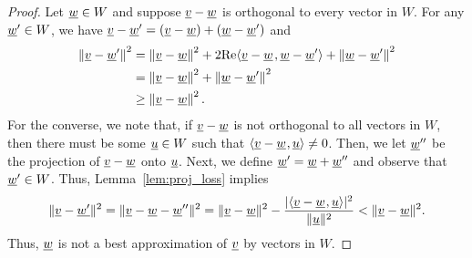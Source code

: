 \begin{proof}
Let $\underline{w} \in W$ and suppose $\underline{v} - \underline{w}$ is orthogonal to every vector in $W$.
For any $\underline{w}' \in W$, we have $\underline{v} - \underline{w}' = \left( \underline{v} - \underline{w} \right) + \left( \underline{w} - \underline{w}' \right)$ and
\begin{equation} \label{equation:OrthogonalVector}
\begin{split}
\left\| \underline{v} - \underline{w}' \right\|^2
&= \left\| \underline{v} - \underline{w} \right\|^2
+ 2 \mathrm{Re} {\left\langle  \underline{v} - \underline{w}  \mskip2mu ,  \underline{w} - \underline{w}'  \right\rangle}
+ \left\| \underline{w} - \underline{w}' \right\|^2 \\
&= \left\| \underline{v} - \underline{w} \right\|^2
+ \left\| \underline{w} - \underline{w}' \right\|^2 \\
&\geq \left\| \underline{v} - \underline{w} \right\|^2.
\end{split}
\end{equation}
For the converse, we note that,
if $\underline{v}-\underline{w}$ is not orthogonal to all vectors in $W$, then there must be some $\underline{u} \in W$ such that ${\langle  \underline{v}-\underline{w}  \mskip1mu ,  \underline{u}  \rangle} \neq 0$.
Then, we let $\underline{w}''$ be the projection of $\underline{v}-\underline{w}$ onto $\underline{u}$.
Next, we define $\underline{w}' = \underline{w}+\underline{w}''$ and observe that $\underline{w}' \in W$.
Thus, Lemma~\ref{lem:proj_loss} implies
\[ \| \underline{v}-\underline{w'} \| ^2 = \| \underline{v}-\underline{w} - \underline{w}'' \| ^2 = \|\underline{v}-\underline{w}\|^2 - \frac{|{\langle  \underline{v}-\underline{w}  \mskip1mu ,  \underline{u}  \rangle}|^2}{\|\underline{u}\|^2} < \| \underline{v}-\underline{w}\|^2. \]
Thus, $\underline{w}$ is not a best approximation of $\underline{v}$ by vectors in $W$.


\end{proof}
